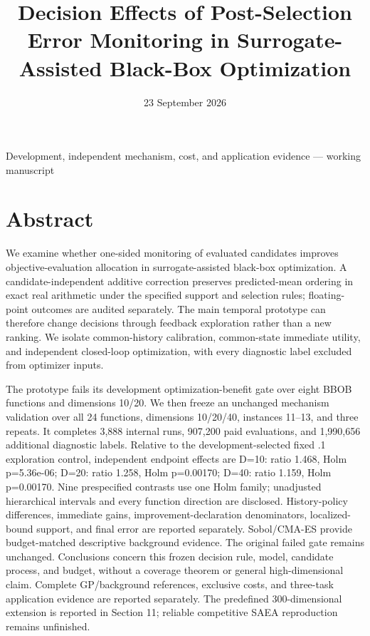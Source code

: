 \documentclass[11pt,a4paper]{article}
\title{Decision Effects of Post-Selection Error Monitoring in
Surrogate-Assisted Black-Box Optimization}
\author{}
\date{23 September 2026}
\begin{document}
\maketitle
\begin{center}Development, independent mechanism, cost, and application
evidence --- working manuscript\end{center}
\hypertarget{abstract}{%
\section{Abstract}\label{abstract}}

We examine whether one-sided monitoring of evaluated candidates improves
objective-evaluation allocation in surrogate-assisted black-box
optimization. A candidate-independent additive correction preserves
predicted-mean ordering in exact real arithmetic under the specified
support and selection rules; floating-point outcomes are audited
separately. The main temporal prototype can therefore change decisions
through feedback exploration rather than a new ranking. We isolate
common-history calibration, common-state immediate utility, and
independent closed-loop optimization, with every diagnostic label
excluded from optimizer inputs.

The prototype fails its development optimization-benefit gate over eight
BBOB functions and dimensions 10/20. We then freeze an unchanged
mechanism validation over all 24 functions, dimensions 10/20/40,
instances 11--13, and three repeats. It completes 3,888 internal runs,
907,200 paid evaluations, and 1,990,656 additional diagnostic labels.
Relative to the development-selected fixed .1 exploration control,
independent endpoint effects are D=10: ratio 1.468, Holm p=5.36e-06;
D=20: ratio 1.258, Holm p=0.00170; D=40: ratio 1.159, Holm p=0.00170.
Nine prespecified contrasts use one Holm family; unadjusted hierarchical
intervals and every function direction are disclosed. History-policy
differences, immediate gains, improvement-declaration denominators,
localized-bound support, and final error are reported separately.
Sobol/CMA-ES provide budget-matched descriptive background evidence. The
original failed gate remains unchanged. Conclusions concern this frozen
decision rule, model, candidate process, and budget, without a coverage
theorem or general high-dimensional claim. Complete GP/background
references, exclusive costs, and three-task application evidence are
reported separately. The predefined 300-dimensional extension is
reported in Section 11; reliable competitive SAEA reproduction remains
unfinished.
\end{document}
